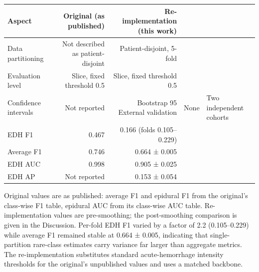 \begin{tabular}{lrr}
\toprule
Aspect & Original (as published) & Re-implementation (this work) \\
\midrule
Data partitioning & Not described as patient-disjoint & Patient-disjoint, 5-fold \\
Evaluation level & Slice, fixed threshold 0.5 & Slice, fixed threshold 0.5 \\
Confidence intervals & Not reported & Bootstrap 95%
External validation & None & Two independent cohorts \\
EDH F1 & 0.467 & 0.166 (folds 0.105–0.229) \\
Average F1 & 0.746 & 0.664 ± 0.005 \\
EDH AUC & 0.998 & 0.905 ± 0.025 \\
EDH AP & Not reported & 0.153 ± 0.054 \\
\bottomrule
\end{tabular}

\vspace{2pt}
{\footnotesize Original values are as published: average F1 and epidural F1 from the original's class-wise F1 table, epidural AUC from its class-wise AUC table. Re-implementation values are pre-smoothing; the post-smoothing comparison is given in the Discussion. Per-fold EDH F1 varied by a factor of 2.2 (0.105–0.229) while average F1 remained stable at 0.664 ± 0.005, indicating that single-partition rare-class estimates carry variance far larger than aggregate metrics. The re-implementation substitutes standard acute-hemorrhage intensity thresholds for the original's unpublished values and uses a matched backbone.}
